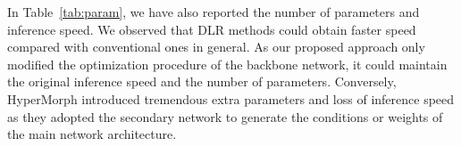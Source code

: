 \documentclass[runningheads]{llncs}
\begin{document}
In Table~\ref{tab:param}, we have also reported the number of parameters and inference speed. We observed that DLR methods could obtain faster speed compared with conventional ones in general. As our proposed approach only modified the optimization procedure of the backbone network, it could maintain the original inference speed and the number of parameters. Conversely, HyperMorph introduced tremendous extra parameters and loss of inference speed as they adopted the secondary network to generate the conditions or weights of the main network architecture.


\end{document}
